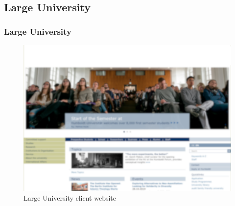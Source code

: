 \documentclass[aspectratio=169]{beamer}
\begin{document}
\subsection{Large University}
\begin{frame}
  \frametitle{Large University}
  \begin{figure}
    \includegraphics[height=.7\textheight]{./img/003_-_large_university.png}
    \caption{Large University client website}
  \end{figure}
\end{frame}
\end{document}
